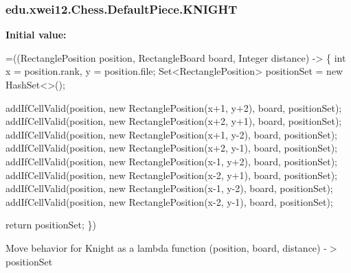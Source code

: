\subsubsection[{\texorpdfstring{K\+N\+I\+G\+HT}{KNIGHT}}]{\setlength{\rightskip}{0pt plus 5cm}edu.\+xwei12.\+Chess.\+Default\+Piece.\+K\+N\+I\+G\+HT}\hypertarget{enumedu_1_1xwei12_1_1_chess_1_1_default_piece_adc547e747617c6106290318e5cb0c9b9}{}\label{enumedu_1_1xwei12_1_1_chess_1_1_default_piece_adc547e747617c6106290318e5cb0c9b9}
{\bfseries Initial value\+:}
\begin{DoxyCode}
=((RectanglePosition position, RectangleBoard board, Integer distance) -> \{
        \textcolor{keywordtype}{int} x = position.rank, y = position.file;
        Set<RectanglePosition> positionSet = \textcolor{keyword}{new} HashSet<>();

        
        addIfCellValid(position, \textcolor{keyword}{new} RectanglePosition(x+1, y+2), board, positionSet);
        addIfCellValid(position, \textcolor{keyword}{new} RectanglePosition(x+2, y+1), board, positionSet);
        addIfCellValid(position, \textcolor{keyword}{new} RectanglePosition(x+1, y-2), board, positionSet);
        addIfCellValid(position, \textcolor{keyword}{new} RectanglePosition(x+2, y-1), board, positionSet);
        addIfCellValid(position, \textcolor{keyword}{new} RectanglePosition(x-1, y+2), board, positionSet);
        addIfCellValid(position, \textcolor{keyword}{new} RectanglePosition(x-2, y+1), board, positionSet);
        addIfCellValid(position, \textcolor{keyword}{new} RectanglePosition(x-1, y-2), board, positionSet);
        addIfCellValid(position, \textcolor{keyword}{new} RectanglePosition(x-2, y-1), board, positionSet);

        \textcolor{keywordflow}{return} positionSet;
    \})
\end{DoxyCode}
Move behavior for Knight as a lambda function (position, board, distance) -\/$>$ position\+Set 
